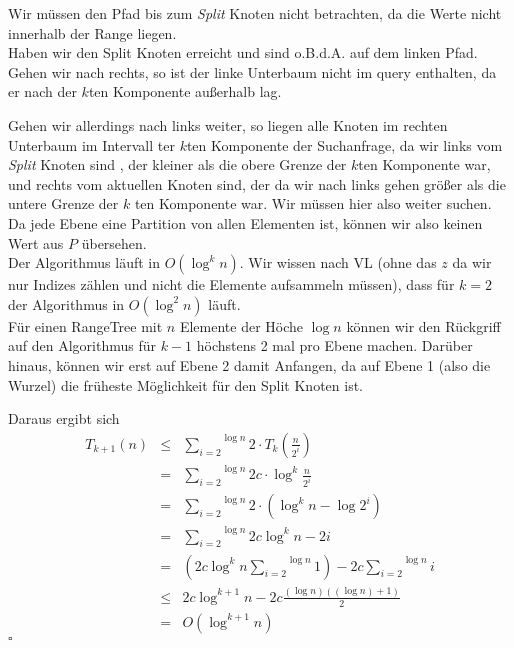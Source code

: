 \documentclass[11pt,a4paper,ngerman]{article}
\begin{document}
Wir müssen den Pfad bis zum \emph{Split} Knoten nicht betrachten, da die Werte nicht innerhalb der Range liegen.\\
Haben wir den Split Knoten erreicht und sind o.B.d.A. auf dem linken Pfad. Gehen wir nach rechts,
so ist der linke Unterbaum nicht im query enthalten, da er nach der $k$ten Komponente außerhalb lag.

Gehen wir allerdings nach links weiter, so liegen alle Knoten im rechten Unterbaum im Intervall ter $k$ten Komponente der
Suchanfrage, da wir links vom \emph{Split} Knoten sind , der kleiner als die obere Grenze der $k$ten Komponente war, und
rechts vom aktuellen Knoten sind, der da wir nach links gehen größer als die untere Grenze der $k$ ten Komponente war.
Wir müssen hier also weiter suchen.\\
Da jede Ebene eine Partition von allen Elementen ist, können wir also keinen Wert aus $P$ übersehen.\\

Der Algorithmus läuft in $O(\log^{k} n)$. Wir wissen nach VL (ohne das $z$ da wir nur Indizes zählen und
nicht die Elemente aufsammeln müssen), dass für $k=2$ der Algorithmus
in $O(\log^2 n)$ läuft.\\

Für einen RangeTree mit $n$ Elemente der Höche $\log n$ können wir den Rückgriff auf den Algorithmus für $k-1$ höchstens
2 mal pro Ebene machen. Darüber hinaus, können wir erst auf Ebene 2 damit Anfangen, da auf Ebene 1 (also die Wurzel) die
früheste Möglichkeit für den Split Knoten ist.

Daraus ergibt sich
\begin{equation*}\begin{array}{rcl}
    T_{k+1}(n) &\leq& \overset{\log n}{\underset{i = 2}{\sum}} 2 \cdot T_k(\frac{n}{2^i})\\
        &=& \overset{\log n}{\underset{i=2}{\sum}} 2 c \cdot \log^k \frac{n}{2^i}\\
        &=& \overset{\log n}{\underset{i=2}{\sum}} 2 \cdot (\log^k n - \log 2^i)\\
        &=& \overset{\log n}{\underset{i=2}{\sum}} 2 c \log^k n - 2i\\
        &=& \left( 2c \log^k n \overset{\log n}{\underset{i=2}{\sum}} 1 \right) - 2c \overset{\log n}{\underset{i=2}{\sum}} i\\
        &\leq& 2c  \log^{k+1} n - 2c \frac{(\log n)((\log n) + 1)}{2}\\
        &=& O(\log^{k+1} n)
\end{array}\end{equation*}
\mbox{}\hfill $\square$
\label{LastPage}
\end{document}
